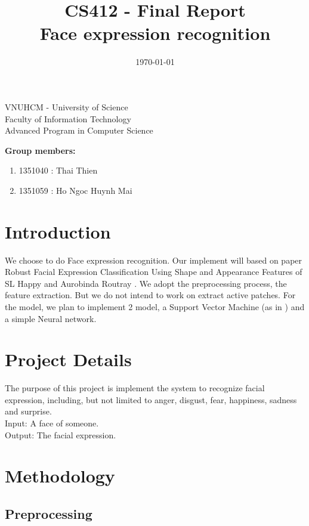 \documentclass[a4paper, 12pt]{article}
\title{CS412 - Final Report\\ Face expression recognition}
\date{\today}
\begin{document}
\begin{center} 
\large VNUHCM - University of Science\\
Faculty of Information Technology\\
Advanced Program in Computer Science
\end{center}

\begingroup
\let\newpage\relax
\maketitle
\endgroup

\textbf{Group members:}
\begin{enumerate}
	\item 1351040 : Thai Thien
	\item 1351059 : Ho Ngoc Huynh Mai
\end{enumerate}

\section{Introduction}

We choose to do Face expression recognition. Our implement will based on paper Robust Facial Expression Classification Using Shape and Appearance Features of SL Happy and Aurobinda Routray \cite{7050661}. We adopt the preprocessing process, the feature extraction. But we do not intend to work on extract active patches. For the model, we plan to implement 2 model, a Support Vector Machine (as in \cite{7050661}) and a simple Neural network.      

\section{Project Details}
The purpose of this project is implement the system to recognize facial expression, including, but not limited to anger, disgust, fear, happiness, sadness and surprise. \\
Input: A face of someone. \\
Output: The facial expression. \\ 

\section{Methodology}

\subsection{Preprocessing}
\label{sec:preprocessing}
\end{document}
